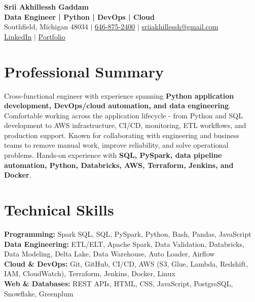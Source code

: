 \documentclass[letterpaper,10pt]{article}
\begin{document}
\fontsize{9.35pt}{10.45pt}\selectfont

\begin{center}
    {\LARGE \textbf{Srii Akhillessh Gaddam}} \\[-1pt]
    \textbf{Data Engineer | Python | DevOps | Cloud} \\[2pt]
    Southfield, Michigan 48034 $|$
    \href{tel:6468752400}{646-875-2400} $|$
    \href{mailto:sriiakhillessh@gmail.com}{sriiakhillessh@gmail.com} \\[1pt]
    \href{https://www.linkedin.com/in/srii-akhiilessh-gaddam-b48668191/}{LinkedIn} $|$
    \href{https://sriiakhillesshg.github.io/portfolio/}{Portfolio}
\end{center}
\vspace{-8pt}

\section{Professional Summary}
\small{Cross-functional engineer with experience spanning \textbf{Python application development, DevOps/cloud automation, and data engineering}. Comfortable working across the application lifecycle - from Python and SQL development to AWS infrastructure, CI/CD, monitoring, ETL workflows, and production support. Known for collaborating with engineering and business teams to remove manual work, improve reliability, and solve operational problems. Hands-on experience with \textbf{SQL, PySpark, data pipeline automation, Python, Databricks, AWS, Terraform, Jenkins, and Docker}.}

\section{Technical Skills}
\small{
\textbf{Programming:} Spark SQL, SQL, PySpark, Python, Bash, Pandas, JavaScript \\
\textbf{Data Engineering:} ETL/ELT, Apache Spark, Data Validation, Databricks, Data Modeling, Delta Lake, Data Warehouse, Auto Loader, Airflow \\
\textbf{Cloud \& DevOps:} Git, GitHub, CI/CD, AWS (S3, Glue, Lambda, Redshift, IAM, CloudWatch), Terraform, Jenkins, Docker, Linux \\
\textbf{Web \& Databases:} REST APIs, HTML, CSS, JavaScript, PostgreSQL, Snowflake, Greenplum
}
\end{document}
